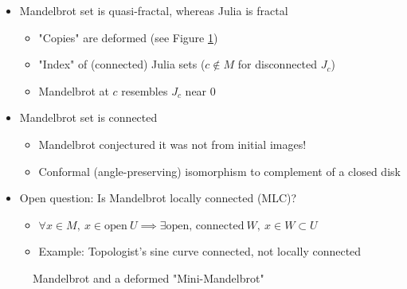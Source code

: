 \documentclass{article}
\begin{document}
\begin{itemize}
    \item Mandelbrot set is quasi-fractal, whereas Julia is fractal
    \begin{itemize}
        \item "Copies" are deformed (see Figure \ref{fig:MandelbrotSet})
        \item "Index" of (connected) Julia sets ($c \not \in M$ for disconnected $J_c$)
        \item Mandelbrot at $c$ resembles $J_c$ near $0$
    \end{itemize}

    \item Mandelbrot set is connected
    \begin{itemize}
        \item Mandelbrot conjectured it was not from initial images!
        \item Conformal (angle-preserving) isomorphism to complement of a closed disk
    \end{itemize}

    \item Open question: Is Mandelbrot locally connected (MLC)?
    \begin{itemize}
        \item $\forall x \in M,\ x \in \textrm{open}\ U  \implies \exists \text{open, connected}\ W,\ x \in W \subset U$
        \item Example: Topologist's sine curve connected, not locally connected
    \end{itemize}
\end{itemize}


\begin{figure}[!htbp]
    \centering
    \caption{Mandelbrot \cite{NormalMandelbrot} and a deformed "Mini-Mandelbrot" \cite{MiniMandelbrot}} %
    \label{fig:MandelbrotSet}%
\end{figure}%
\end{document}
